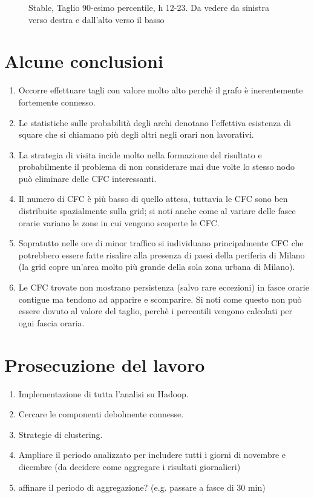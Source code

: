 \documentclass[10pt,a4paper]{article}
\begin{document}
\begin{figure}
\begin{subfigure}[b]{1\textwidth}
\end{subfigure}
\caption{Stable, Taglio 90-esimo percentile, h 12-23. Da vedere da sinistra verso destra e dall'alto verso il basso}
\end{figure}

\section{Alcune conclusioni}

\begin{enumerate}
\item Occorre effettuare tagli con valore molto alto perchè il grafo è inerentemente fortemente connesso.
\item Le statistiche sulle probabilità degli archi denotano l'effettiva esistenza di square che si chiamano
più degli altri negli orari non lavorativi.
\item La strategia di visita incide molto nella formazione del risultato e probabilmente il problema di
non considerare mai due volte lo stesso nodo può eliminare delle CFC interessanti.
\item Il numero di CFC è più basso di quello attesa, tuttavia le CFC sono ben distribuite spazialmente 
sulla grid; si noti anche come al variare delle fasce orarie variano le zone in cui vengono scoperte
le CFC.
\item Sopratutto nelle ore di minor traffico si individuano principalmente CFC che potrebbero essere
fatte risalire alla presenza di paesi della periferia di Milano (la grid copre un'area molto più grande
della sola zona urbana di Milano).
\item Le CFC trovate non mostrano persistenza (salvo rare eccezioni) in fasce orarie contigue ma tendono
ad apparire e scomparire. Si noti come questo non può essere dovuto al valore del taglio, perchè
i percentili vengono calcolati per ogni fascia oraria.
\end{enumerate}

\section{Prosecuzione del lavoro}

\begin{enumerate}
\item Implementazione di tutta l'analisi su Hadoop.
\item Cercare le  componenti debolmente connesse.
\item Strategie di clustering.
\item Ampliare il periodo analizzato per includere tutti i giorni di novembre e dicembre (da decidere
come aggregare i risultati giornalieri)
\item affinare il periodo di aggregazione? (e.g. passare a fasce di 30 min)
\end{enumerate}
\end{document}
